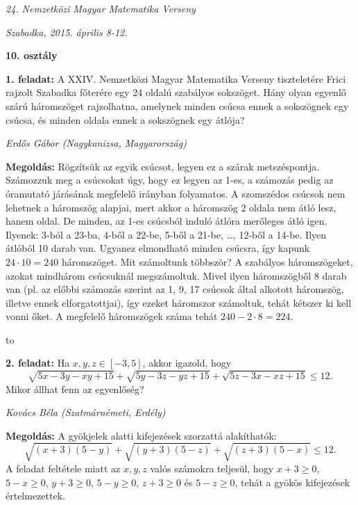 \documentclass[a4paper,10pt,leqno]{article}
\newcommand{\ki}[2]{\hfill {\it #1 (#2)}\medskip}
\newcommand{\vonal}{\hbox to \hsize{\hskip2truecm\hrulefill\hskip2truecm}}
\begin{document}
\begin{center} \Large {\em 24. Nemzetközi Magyar Matematika Verseny} \end{center}
\begin{center} \large{\em Szabadka, 2015. április 8-12.} \end{center}
\smallskip
\begin{center} \large{\bf 10. osztály} \end{center}
\bigskip 

{\bf 1. feladat: } A XXIV. Nemzetközi Magyar Matematika Verseny tiszteletére Frici rajzolt Szabadka főterére egy 24 oldalú szabályos sokszöget. Hány olyan egyenlő szárú háromszöget rajzolhatna, amelynek minden csúcsa ennek a sokszögnek egy csúcsa, és minden oldala ennek a sokszögnek egy átlója?

\ki{Erdős Gábor}{Nagykanizsa, Magyarország}\medskip

{\bf Megoldás: } Rögzítsük az egyik csúcsot, legyen ez a szárak metszéspontja. Számozzuk meg a csúcsokat úgy, hogy ez legyen az 1-es, a számozás pedig az óramutató járásának megfelelő irányban folyamatos. A szomszédos csúcsok nem lehetnek a háromszög alapjai, mert akkor a háromszög 2 oldala nem átló lesz, hanem oldal. De minden, az 1-es csúcsból induló átlóra merőleges átló igen. Ilyenek: 3-ból a 23-ba, 4-ből a 22-be, 5-ből a 21-be, \ldots, 12-ből a 14-be. Ilyen átlóból 10 darab van. Ugyanez elmondható minden csúcsra, így kapunk $24\cdot 10=240$ háromszöget. Mit számoltunk többször? A szabályos háromszögeket, azokat mindhárom csúcsuknál megszámoltuk. Mivel ilyen háromszögből 8 darab van (pl. az előbbi számozás szerint az 1, 9, 17 csúcsok által alkotott háromszög, illetve ennek elforgatottjai), így ezeket háromszor számoltuk, tehát kétszer ki kell vonni őket. A megfelelő háromszögek száma tehát $240-2\cdot 8=224$.


\vonal

{\bf 2. feladat: } Ha $x,y,z\in[-3, 5]$, akkor igazold, hogy
$$\sqrt{5x-3y-xy+15}+
\sqrt{5y-3z-yz+15}+\sqrt{5z-3x-xz+15}\le 12.$$
Mikor állhat fenn az egyenlőség?

\ki{Kovács Béla}{Szatmárnémeti, Erdély}\medskip

{\bf Megoldás: } A gyökjelek alatti kifejezések szorzattá alakíthatók:
$$\sqrt{(x+3)(5-y)}+
\sqrt{(y+3)(5-z)}+\sqrt{(z+3)(5-x)}\le 12.$$
A feladat feltétele miatt az $x, y, z$ valós számokra teljesül, 
hogy $x+3\ge 0$, 
$5-x\ge 0$, 
$y+3\ge 0$, 
$5-y\ge 0$,  
$z+3\ge 0$
és 
$5-z\ge 0$, tehát a gyökös kifejezések értelmezettek.
\end{document}
